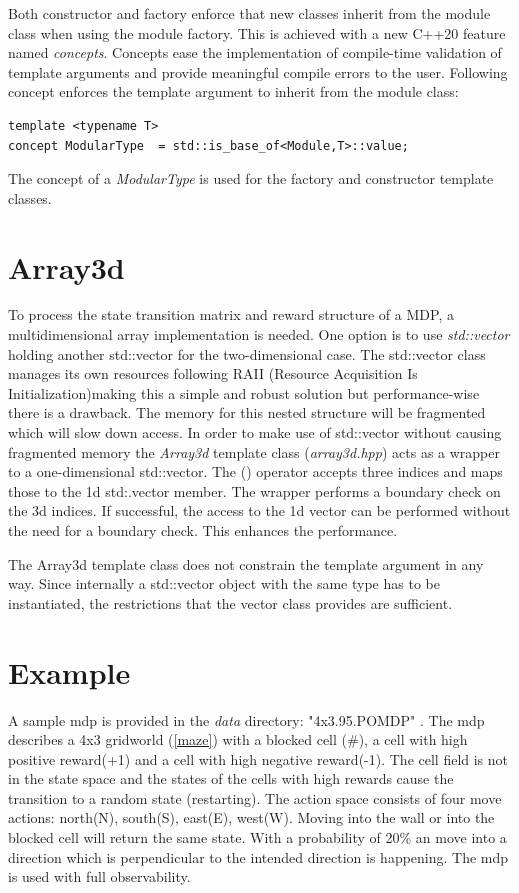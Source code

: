 Both constructor and factory enforce that new classes inherit from the module class when using the module factory. This is achieved with a new C++20 feature named \emph{concepts}. Concepts ease the implementation of compile-time validation of template arguments and provide meaningful compile errors to the user. 
Following concept enforces the template argument to inherit from the module class:

\begin{lstlisting}
template <typename T>
concept ModularType  = std::is_base_of<Module,T>::value;
\end{lstlisting}

The concept of a \emph{ModularType} is used for the factory and constructor template classes. 

\section{Array3d}
\label{array}
To process the state transition matrix and reward structure of a MDP, a multidimensional array implementation is needed. One option is to use \emph{std::vector} holding another std::vector for the two-dimensional case. The std::vector class manages its own resources following RAII (Resource Acquisition Is Initialization)making this a simple and robust solution but performance-wise there is a drawback. The memory for this nested structure will be fragmented which will slow down access. 
In order to make use of std::vector without causing fragmented memory the \emph{Array3d} template class (\emph{array3d.hpp}) acts as a wrapper to a one-dimensional std::vector. The () operator accepts three indices and maps those to the 1d std:.vector member. The wrapper performs a boundary check on the 3d indices. If successful, the access to the 1d vector can be performed without the need for a boundary check. This enhances the performance.  

The Array3d template class does not constrain the template argument in any way. Since internally a std::vector object with the same type has to be instantiated, the restrictions that the vector class provides are sufficient. 





\section{Example}

A sample mdp is provided in the \emph{data} directory: "4x3.95.POMDP" \autocite{Cassandra}. The mdp describes a 4x3 gridworld (\autoref{maze}) with a blocked cell (\#), a cell with high positive reward(+1) and a cell with high negative reward(-1). The cell field is not in the state space and the states of the cells with high rewards cause the transition to a random state (restarting). The action space consists of four move actions: north(N), south(S), east(E), west(W). Moving into the wall or into the blocked cell will return the same state. With a probability of 20\% an move into a direction which is perpendicular to the intended direction is happening. The mdp is used with full observability. 

